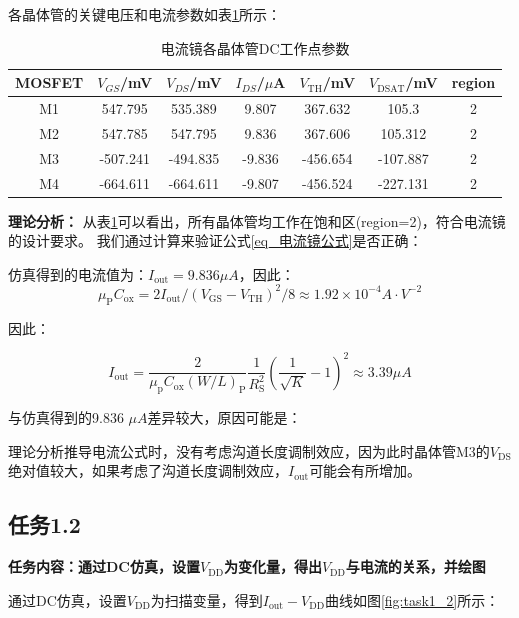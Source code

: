 \documentclass[UTF8,12pt,a4paper]{ctexart}
\begin{document}
各晶体管的关键电压和电流参数如表\ref{tab:task1_1}所示：

\begin{table}[h]
\centering
\caption{电流镜各晶体管DC工作点参数}
\label{tab:task1_1}
\begin{tabular}{|c|c|c|c|c|c|c|}
\hline
MOSFET & $V_{GS}$/mV & $V_{DS}$/mV & $I_{DS}$/$\mu$A & $V_{\text{TH}}$/mV & $V_{\text{DSAT}}$/mV & region\\
\hline
M1 & 547.795 & 535.389 & 9.807 & 367.632 & 105.3  & 2\\
\hline
M2 & 547.785 & 547.795 & 9.836 & 367.606 & 105.312  & 2\\
\hline
M3 & -507.241 & -494.835 & -9.836 & -456.654 & -107.887  & 2\\
\hline
M4 & -664.611 & -664.611 & -9.807 & -456.524 & -227.131 & 2\\
\hline
\end{tabular}
\end{table}

\textbf{理论分析：}
从表\ref{tab:task1_1}可以看出，所有晶体管均工作在饱和区(region=2)，符合电流镜的设计要求。
我们通过计算来验证公式\eqref{eq_电流镜公式}是否正确：

仿真得到的电流值为：$I_{\text{out}} = 9.836\mu A$，因此：
\begin{equation}
    \mu_{\text{P}}C_{\text{ox}} = 2I_{\text{out}}/(V_{\text{GS}}-V_{\text{TH}})^2/8 \approx 1.92 \times 10^{-4} A\cdot V^{-2} 
\end{equation}

因此：

\begin{equation}
    I_{\text{out}} = \frac{2}{\mu_{\text{p}} C_{\text{ox}} (W/L)_{\text{P}}}\frac{1}{R_{\text{S}}^2}(\frac{1}{\sqrt{K}}-1)^2 \approx 3.39 \mu A
\end{equation}


与仿真得到的9.836 $\mu A$差异较大，原因可能是：

理论分析推导电流公式时，没有考虑沟道长度调制效应，因为此时晶体管M3的$V_{\text{DS}}$绝对值较大，如果考虑了沟道长度调制效应，$I_{\text{out}}$可能会有所增加。

\subsection{任务1.2}
\textbf{任务内容：通过DC仿真，设置$V_{\text{DD}}$为变化量，得出$V_{\text{DD}}$与电流的关系，并绘图}

通过DC仿真，设置$V_{\text{DD}}$为扫描变量，得到$I_{\text{out}} - V_{\text{DD}}$曲线如图\ref{fig:task1_2}所示：
\end{document}
